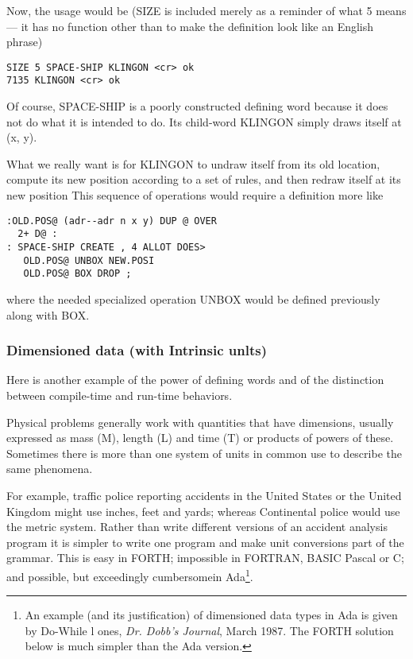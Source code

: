 Now, the usage would be (SIZE is included merely as a reminder of what 5 means — it has no function other than to make the definition look like an English phrase)

\begin{verbatim}
SIZE 5 SPACE-SHIP KLINGON <cr> ok
7135 KLINGON <cr> ok
\end{verbatim}

Of course, SPACE-SHIP is a poorly constructed defining word because it does not do what it is intended to do. Its child-word KLINGON simply draws itself at (x, y).

What we really want is for KLINGON to undraw itself from its old location, compute its new position according to a set of rules, and then redraw itself at its new position This sequence of operations would require a definition more like

\begin{verbatim}
:OLD.POS@ (adr--adr n x y) DUP @ OVER
  2+ D@ :
: SPACE-SHIP CREATE , 4 ALLOT DOES>
   OLD.POS@ UNBOX NEW.POSI
   OLD.POS@ BOX DROP ;
\end{verbatim}

where the needed specialized operation UNBOX would be defined previously along with BOX.

\subsubsection{Dimensioned data (with Intrinsic unlts)}
Here is another example of the power of defining words and of the distinction between compile-time and run-time behaviors.

Physical problems generally work with quantities that have dimensions, usually expressed as mass (M), length (L) and time (T) or products of powers of these. Sometimes there is more than one system of units in common use to describe the same phenomena.

For example, traffic police reporting accidents in the United States or the United Kingdom might use inches, feet and yards; whereas Continental police would use the metric system. Rather than write different versions of an accident analysis program it is simpler to write one program and make unit conversions part of the grammar. This is easy in FORTH; impossible in FORTRAN, BASIC Pascal or C; and possible, but exceedingly cumbersomein Ada\footnote{An example (and its justification) of dimensioned data types in Ada is given by Do-While l ones, \textit{Dr. Dobb's Journal}, March 1987. The FORTH solution below is much simpler than the Ada version.}.

